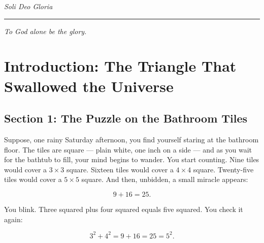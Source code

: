 \documentclass[11pt,openright,twoside]{book}
\theoremstyle{definition}
\begin{document}
\thispagestyle{empty}
\begin{center}
{\large\itshape\color{chaptercolor}
Soli Deo Gloria}

\vspace{0.8cm}

{\color{accentgold}\rule{2cm}{0.5pt}}

\vspace{0.8cm}

{\itshape\color{pagenum}
To God alone be the glory.}
\end{center}
\clearpage

{
\hypersetup{linkcolor=chaptercolor}
\tableofcontents
}
\clearpage

\listoffigures
\clearpage

\chapter*{Introduction: The Triangle That Swallowed the Universe}


\section{Section 1: The Puzzle on the Bathroom Tiles}

Suppose, one rainy Saturday afternoon, you find yourself staring at the bathroom floor. The tiles are square --- plain white, one inch on a side --- and as you wait for the bathtub to fill, your mind begins to wander. You start counting. Nine tiles would cover a $3 \times 3$ square. Sixteen tiles would cover a $4 \times 4$ square. Twenty-five tiles would cover a $5 \times 5$ square. And then, unbidden, a small miracle appears:

\[9 + 16 = 25.\]

You blink. Three squared plus four squared equals five squared. You check it again:

\[3^2 + 4^2 = 9 + 16 = 25 = 5^2.\]
\end{document}
